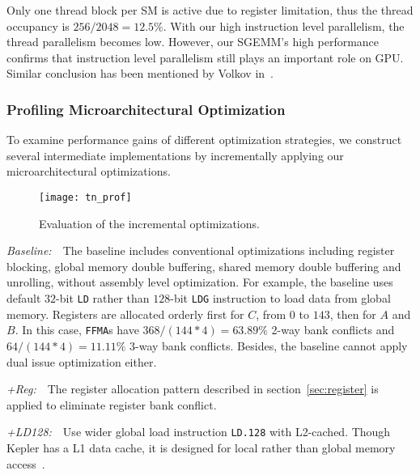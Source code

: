 
Only one thread block per SM is active due to register limitation, thus the thread occupancy is $256/2048=12.5\%$.
With our high instruction level parallelism, the thread parallelism becomes low.
However, our SGEMM's high performance confirms that instruction level parallelism still plays an important role on GPU.
Similar conclusion has been mentioned by Volkov in~\cite{volkov2010better}.

\subsubsection{Profiling Microarchitectural Optimization}

To examine performance gains of different optimization strategies, we construct several intermediate 
implementations by incrementally applying our microarchitectural optimizations.
\begin{figure}[htbp]
\begin{center}
\texttt{[image: tn\_prof]}
    \caption{\small Evaluation of the incremental optimizations.}
\label{fig:th_prof}
\end{center}
\end{figure}

{\it Baseline:}~~The baseline includes conventional optimizations including register blocking, global
memory double buffering, shared memory double buffering and unrolling, without assembly level optimization.
For example, the baseline uses default $32$-bit {\tt LD} rather than $128$-bit {\tt LDG} instruction to load data from global memory.
Registers are allocated orderly first for $C$, from $0$ to $143$, then for $A$ and $B$. 
In this case, {\tt FFMA}s have $368/(144*4)=63.89\%$ 2-way bank conflicts and $64/(144*4)=11.11\%$ 3-way bank conflicts. 
Besides, the baseline cannot apply dual issue optimization either.

{\it +Reg:}~~The register allocation pattern described in section~\ref{sec:register} is applied to eliminate register bank conflict. 

{\it +LD128:}~~Use wider global load instruction {\tt LD.128} with L2-cached.
Though Kepler has a L1 data cache, it is designed for local rather than global memory access~\cite{gk110}.

